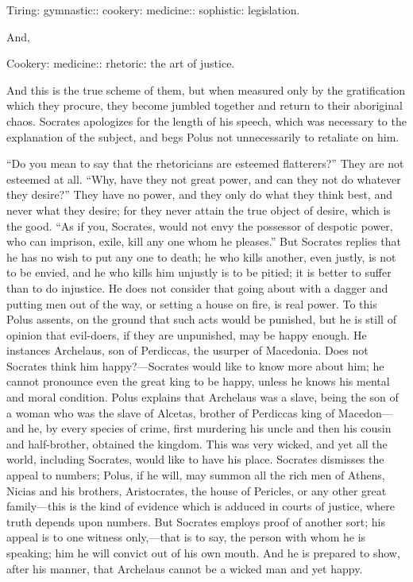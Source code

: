 \documentclass[11pt,letter]{article}
\begin{document}
\par  Tiring: gymnastic:: cookery: medicine:: sophistic: legislation.

\par  And,

\par  Cookery: medicine:: rhetoric: the art of justice.

\par  And this is the true scheme of them, but when measured only by the gratification which they procure, they become jumbled together and return to their aboriginal chaos. Socrates apologizes for the length of his speech, which was necessary to the explanation of the subject, and begs Polus not unnecessarily to retaliate on him.

\par  “Do you mean to say that the rhetoricians are esteemed flatterers?” They are not esteemed at all. “Why, have they not great power, and can they not do whatever they desire?” They have no power, and they only do what they think best, and never what they desire; for they never attain the true object of desire, which is the good. “As if you, Socrates, would not envy the possessor of despotic power, who can imprison, exile, kill any one whom he pleases.” But Socrates replies that he has no wish to put any one to death; he who kills another, even justly, is not to be envied, and he who kills him unjustly is to be pitied; it is better to suffer than to do injustice. He does not consider that going about with a dagger and putting men out of the way, or setting a house on fire, is real power. To this Polus assents, on the ground that such acts would be punished, but he is still of opinion that evil-doers, if they are unpunished, may be happy enough. He instances Archelaus, son of Perdiccas, the usurper of Macedonia. Does not Socrates think him happy?—Socrates would like to know more about him; he cannot pronounce even the great king to be happy, unless he knows his mental and moral condition. Polus explains that Archelaus was a slave, being the son of a woman who was the slave of Alcetas, brother of Perdiccas king of Macedon—and he, by every species of crime, first murdering his uncle and then his cousin and half-brother, obtained the kingdom. This was very wicked, and yet all the world, including Socrates, would like to have his place. Socrates dismisses the appeal to numbers; Polus, if he will, may summon all the rich men of Athens, Nicias and his brothers, Aristocrates, the house of Pericles, or any other great family—this is the kind of evidence which is adduced in courts of justice, where truth depends upon numbers. But Socrates employs proof of another sort; his appeal is to one witness only,—that is to say, the person with whom he is speaking; him he will convict out of his own mouth. And he is prepared to show, after his manner, that Archelaus cannot be a wicked man and yet happy.
\end{document}
